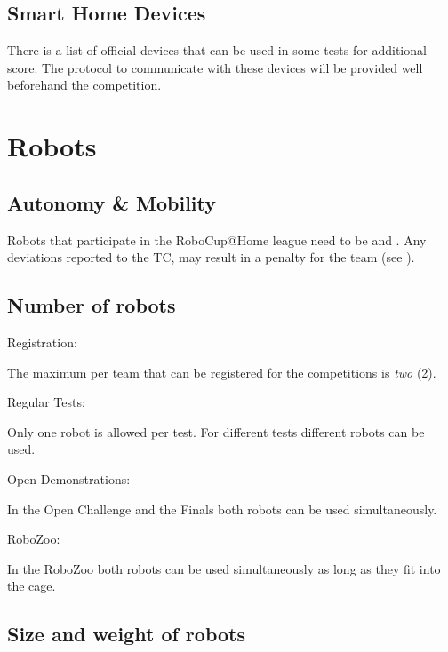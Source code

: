 \subsection{Smart Home Devices}\label{rule:smarthomedevices}

There is a list of official devices that can be used in some tests for additional score.
The protocol to communicate with these devices will be provided well beforehand the
competition.


\section{Robots}\label{rule:robots}

\subsection{Autonomy \& Mobility}
Robots that participate in the RoboCup@Home league need to be
 and .
Any deviations reported to the TC, may result in a penalty for the team (see ).


\subsection{Number of robots}\label{rule:robots_number}

\begin{enumerate}
{\bf\item Registration:} The maximum  per team that can be registered for the competitions is \emph{two} (2).
{\bf\item Regular Tests:} Only one robot is allowed per test. 
  For different tests different robots can be used.
{\bf\item Open Demonstrations:} In the Open Challenge and the Finals both robots can be used simultaneously.
{\bf\item RoboZoo:} In the RoboZoo both robots can be used simultaneously as long as they fit into the cage.
\end{enumerate}


\subsection{Size and weight of robots}\label{rule:robots_size}

